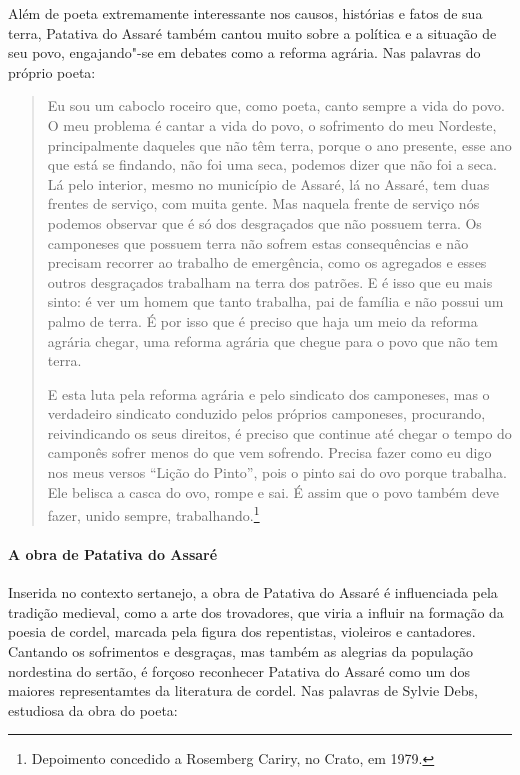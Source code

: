 \documentclass[11pt]{extarticle}
\begin{document}
Além de poeta extremamente interessante nos causos, histórias e fatos de sua terra, Patativa do Assaré também cantou muito sobre a política e a situação de seu povo, engajando"-se em debates como a reforma agrária.
Nas palavras do próprio poeta:

\begin{quote}
Eu sou um caboclo roceiro que, como poeta, canto sempre a vida do
povo. O meu problema é cantar a vida do povo, o sofrimento do meu
Nordeste, principalmente daqueles que não têm terra, porque o ano
presente, esse ano que está se findando, não foi uma seca, podemos dizer
que não foi a seca. Lá pelo interior, mesmo no município de Assaré, lá
no Assaré, tem duas frentes de serviço, com muita gente. Mas naquela
frente de serviço nós podemos observar que é só dos desgraçados que
não possuem terra. Os camponeses que possuem terra não sofrem estas
consequências e não precisam recorrer ao trabalho de emergência, como
os agregados e esses outros desgraçados trabalham na terra dos patrões.
E é isso que eu mais sinto: é ver um homem que tanto trabalha, pai de
família e não possui um palmo de terra. É por isso que é preciso que
haja um meio da reforma agrária chegar, uma reforma agrária que chegue para o povo que não tem terra.

E esta luta pela reforma agrária e pelo sindicato dos camponeses, mas o
verdadeiro sindicato conduzido pelos próprios camponeses, procurando,
reivindicando os seus direitos, é preciso que continue até chegar o
tempo do camponês sofrer menos do que vem sofrendo. Precisa fazer como
eu digo nos meus versos ``Lição do Pinto'', pois o pinto sai do ovo
porque trabalha. Ele belisca a casca do ovo, rompe e sai. É assim que o
povo também deve fazer, unido sempre, trabalhando.\footnote{Depoimento concedido a Rosemberg
Cariry, no Crato, em 1979.}
\end{quote}

\paragraph{A obra de Patativa do Assaré}
Inserida no contexto sertanejo, a obra de Patativa do Assaré é influenciada pela tradição medieval, como a arte dos trovadores, que viria a influir na formação da poesia de cordel, marcada pela figura dos repentistas, violeiros e cantadores.
Cantando os sofrimentos e desgraças, mas também as alegrias da população nordestina do sertão, é forçoso reconhecer Patativa do Assaré como um dos maiores representamtes da literatura de cordel. Nas palavras de Sylvie Debs, estudiosa da obra do poeta:
\end{document}
